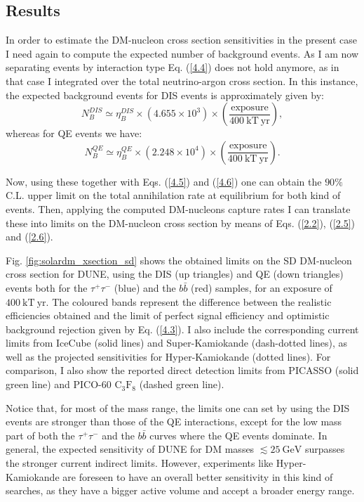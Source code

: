 \subsection{Results}

In order to estimate the DM-nucleon cross section sensitivities in the present case I need again to compute the expected number of background events. As I am now separating events by interaction type Eq. (\ref{4.4}) does not hold anymore, as in that case I integrated over the total neutrino-argon cross section. In this instance, the expected background events for DIS events is approximately given by:
\begin{equation}\label{6.11}
	N_{B}^{DIS} \simeq \eta_{B}^{DIS} \times \left(4.655 \times 10^{3}\right) \times \left(\frac{\mathrm{exposure}}{400 \ \mathrm{kT} \ \mathrm{yr}}\right),
\end{equation}
whereas for QE events we have:
\begin{equation}\label{6.12}
	N_{B}^{QE} \simeq \eta_{B}^{QE} \times \left(2.248\times 10^{4}\right) \times \left(\frac{\mathrm{exposure}}{400 \ \mathrm{kT} \ \mathrm{yr}}\right).
\end{equation}

Now, using these together with Eqs. (\ref{4.5}) and (\ref{4.6}) one can obtain the $90\%$ C.L. upper limit on the total annihilation rate at equilibrium for both kind of events. Then, applying the computed DM-nucleons capture rates I can translate these into limits on the DM-nucleon cross section by means of Eqs. (\ref{2.2}), (\ref{2.5}) and (\ref{2.6}).

Fig. \ref{fig:solardm_xsection_sd} shows the obtained limits on the SD DM-nucleon cross section for DUNE, using the DIS (up triangles) and QE (down triangles) events both for the $\tau^{+}\tau^{-}$ (blue) and the $b\bar{b}$ (red) samples, for an exposure of $400 \ \mathrm{kT} \ \mathrm{yr}$. The coloured bands represent the difference between the realistic efficiencies obtained and the limit of perfect signal efficiency and optimistic background rejection given by Eq. (\ref{4.3}). I also include the corresponding current limits from IceCube \cite{IceCube2021} (solid lines) and Super-Kamiokande (dash-dotted lines), as well as the projected sensitivities for Hyper-Kamiokande \cite{Bell2021} (dotted lines). For comparison, I also show the reported direct detection limits from PICASSO \cite{Behnke2016} (solid green line) and PICO-60 $\mathrm{C}_{3}\mathrm{F}_{8}$ \cite{PICO2019} (dashed green line).

Notice that, for most of the mass range, the limits one can set by using the DIS events are stronger than those of the QE interactions, except for the low mass part of both the $\tau^{+}\tau^{-}$ and the $b\bar{b}$ curves where the QE events dominate. In general, the expected sensitivity of DUNE for DM masses $\lesssim 25 \ \mathrm{GeV}$ surpasses the stronger current indirect limits. However, experiments like Hyper-Kamiokande are foreseen to have an overall better sensitivity in this kind of searches, as they have a bigger active volume and accept a broader energy range.

